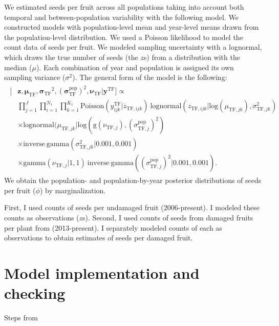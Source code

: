 \documentclass[12pt, oneside, titlepage]{article}   	%
\begin{document}
We estimated seeds per fruit across all populations taking into account both temporal and between-population variability with the following model. We constructed models with population-level mean and year-level means drawn from the population-level distribution. We used a Poisson likelihood to model the count data of seeds per fruit. We modeled sampling uncertainty with a lognormal, which draws the true number of seeds (the $z$s) from a distribution with the median ($\mu$). Each combination of year and population is assigned its own sampling variance ($\sigma^2$). The general form of the model is the following: 
%
\begin{align}
  \begin{split}
  [ &  \bm{z} ,  \bm{\mu_{\mathrm{TF}}} ,  \bm{\sigma_{\mathrm{TF}}}^2 , ( \bm{\sigma^\mathrm{pop}_{\mathrm{TF}}})^2, \bm{\nu_{\mathrm{TF}}}  |  \bm{y^{\mathrm{TF}}} ]  \propto  \\  
 	     & \prod_{j=1}^{J} \prod_{i=1}^{N_1}  \prod_{k=1}^{K_1}  \mathrm{Poisson} ( y^\mathrm{TF}_{ijk} | z_{\mathrm{TF},ijk} )\ \mathrm{lognormal} ( z_{\mathrm{TF},ijk} | \mathrm{log}(\mu_{\mathrm{TF},jk}), \sigma^2_{\mathrm{TF},jk} )  \\
	     & \times \mathrm{lognormal} ( \mu_{\mathrm{TF},jk} | \mathrm{log}(\mathrm{g}(\nu_{\mathrm{TF},j}), (\sigma^\mathrm{pop}_{\mathrm{TF},j} )^2)  \\
	     & \times \mathrm{inverse\ gamma} ( \sigma^2_{\mathrm{TF},jk}  | 0.001, 0.001 ) \\
	     & \times \mathrm{gamma} (\nu_{\mathrm{TF},j} | 1 , 1)\  \mathrm{inverse\ gamma} ( (\sigma^\mathrm{pop}_{\mathrm{TF},j} )^2 | 0.001, 0.001 ) .
  \end{split}
\end{align}
%
We obtain the population- and population-by-year posterior distributions of seeds per fruit ($\phi$) by marginalization. 

First, I used counts of seeds per undamaged fruit (2006-present). I modeled these counts as observations ($z$s). Second, I used counts of seeds from damaged fruits per plant from (2013-present). I separately modeled counts of each as observations to obtain estimates of seeds per damaged fruit.

\iffalse
\section{Model implementation and checking}

Steps from \cite{gelman2020}
\end{document}
